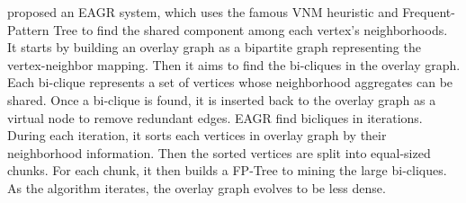 
%
%
%


\cite{mondal2014eagr} proposed an EAGR system, which uses the famous VNM heuristic and Frequent-Pattern
Tree to find the shared component among each vertex's neighborhoods. It starts by building an
overlay graph as a bipartite graph representing the vertex-neighbor mapping. Then it aims to
find the bi-cliques in the overlay graph. Each bi-clique represents a set of vertices whose neighborhood
aggregates can be shared. Once a bi-clique is found, it is inserted back to the overlay graph as
a virtual node to remove redundant edges. EAGR find bicliques in iterations. During each iteration,
it sorts each vertices in overlay graph by their neighborhood information. Then the sorted vertices 
are split into equal-sized chunks. For each chunk, it then builds a FP-Tree to mining the large bi-cliques. 
As the algorithm iterates, the overlay graph evolves to be less dense. 


